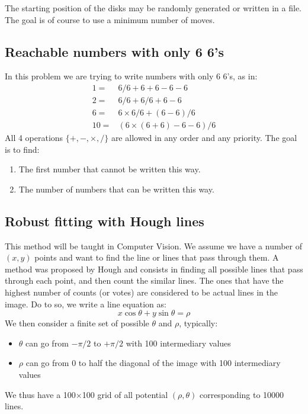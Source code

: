 \documentclass{ecnreport}
\begin{document}
The starting position of the disks may be randomly generated or written in a file. The goal is of course to use a minimum number of moves.

\begin{itemize}
 \end{itemize}
 
 \subsection{Reachable numbers with only 6 6's}
 
 In this problem we are trying to write numbers with only 6 6's, as in:
 \begin{eqnarray*}
  1 =& 6/6 + 6 +6-6-6 \\
  2 =& 6/6 + 6/6 + 6 - 6 \\
  6 =& 6\times 6/6 + (6-6)/6 \\
  10 =& (6\times(6+6) -6 -6)/6
 \end{eqnarray*}
 All 4 operations $\{+, -, \times, /\}$ are allowed in any order and any priority.
 The goal is to find:
 \begin{enumerate}
  \item The first number that cannot be written this way.
  \item The number of numbers that can be written this way.
 \end{enumerate}
\begin{itemize}
 \end{itemize}
 
 
 \subsection{Robust fitting with Hough lines}
 
 This method will be taught in Computer Vision. We assume we have a number of $(x,y)$ points and want to find the line or lines that pass through them.
 A method was proposed by Hough and consists in finding all possible lines that pass through each point, and then count the similar lines. The ones that have
 the highest number of counts (or votes) are considered to be actual lines in the image.
 Do to so, we write a line equation as:
 \begin{equation*}
  x\cos\theta + y\sin\theta = \rho
 \end{equation*}We then consider a finite set of possible $\theta$ and $\rho$, typically:
 \begin{itemize}
  \item $\theta$ can go from $-\pi/2$ to $+\pi/2$ with 100 intermediary values
  \item $\rho$ can go from 0 to half the diagonal of the image with 100 intermediary values
 \end{itemize}
 We thus have a 100$\times$100 grid of all potential $(\rho,\theta)$ corresponding to 10000 lines.
 
\end{document}
